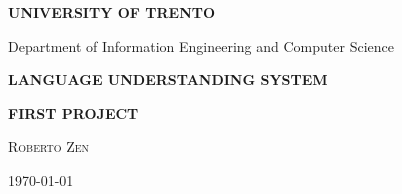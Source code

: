 \begin{titlepage}
	\pagestyle{empty}

	\begin{center}
		{\bfseries\Large {\huge U}NIVERSITY OF {\huge T}RENTO}

		\vspace{0.2cm}

		{\large Department of Information Engineering and Computer Science}

		\vspace{5.5cm}

		{\Large \bfseries {{\huge L}ANGUAGE {\huge U}NDERSTANDING} {\huge S}YSTEM}

		\vspace{1.0cm}

		{\Large \bfseries {FIRST PROJECT}}

		\vspace{2.5cm}
		
		{\large \textsc{Roberto Zen}}

		\vspace{1.0cm}
		
		{\today}

		\vfill

	\end{center}

\end{titlepage}
